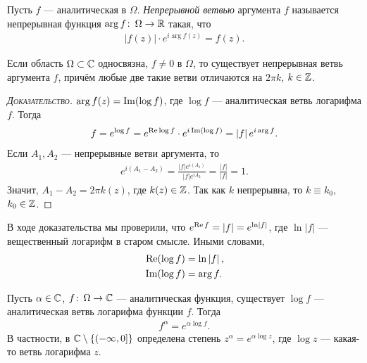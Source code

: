 \documentclass[../../main.tex]{subfiles}
\begin{document}
\begin{df}
 Пусть $ f $ --- аналитическая в $ \Omega $. \textit{Непрерывной ветвью} аргумента $ f $ называется непрерывная функция $ \arg f \colon\, \Omega \to \mathbb{R} $ такая, что
 \begin{align*}
  \left| f(z) \right| \cdot e^{i \arg f(z)} = f(z).
 \end{align*}
\end{df}
\begin{thm}
 Если область $ \Omega \subset \mathbb{C}  $ односвязна, $ f \neq 0 $ в $ \Omega $, то существует непрерывная ветвь аргумента $ f $, причём любые две такие ветви отличаются на $ 2\pi k $, $ k \in \mathbb{Z} $.
\end{thm}
\begin{proof}[\normalfont\textsc{Доказательство}]
 $ \arg f(z) = \operatorname{Im} (\log f) $, где $ \log f $ --- аналитическая ветвь логарифма $ f $. Тогда
 \begin{align*}
 f = e^{\log f} = e^{\operatorname{Re} \log f} \cdot e^{i \operatorname{Im} (\log f)} = \left| f \right| e^{i \arg f}.
 \end{align*} Если $ A_1, A_2 $ --- непрерывные ветви аргумента, то
 \begin{align*}
  e^{i(A_1 - A_2)} = \frac{\left| f \right|e^{i(A_1)}}{\left| f \right|e^{iA_2}} = \frac{\left| f \right|}{\left| f \right|} = 1.
 \end{align*} Значит, $ A_1 - A_2 = 2\pi k(z) $, где $ k(z) \in \mathbb{Z} $. Так как $ k $ непрерывна, то $ k \equiv k_0 $, $ k_0 \in \mathbb{Z} $.
\end{proof}
\begin{remrk}
 В ходе доказательства мы проверили, что $ e^{\operatorname{Re} f} = \left| f \right| = e^{\ln \left| f \right|} $, где $ \ln \left| f \right| $ --- вещественный логарифм в старом смысле. Иными словами,
 \begin{align*}
  \operatorname{Re} (\log f) &= \ln \left| f \right|, \\
  \operatorname{Im} (\log f) &= \arg f.
 \end{align*}
\end{remrk}

\begin{df}
 Пусть $ \alpha \in\mathbb{C} $, $ f \colon\, \Omega \to \mathbb{C}   $ --- аналитическая функция, существует $ \log f $  --- аналитическая ветвь логарифма функции $ f $. Тогда
 \begin{align*}
  f^{\alpha} = e^{\alpha \log f}.
 \end{align*} В частности, в $ \mathbb{C} \setminus \left\{ \left(-\infty, 0\right]   \right\} $  определена степень $ z^{\alpha} = e^{\alpha \log z} $, где $ \log z $ --- какая-то ветвь логарифма $ z $.
\end{df}
\end{document}
